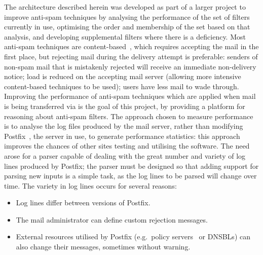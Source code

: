 \documentclass[draft]{svmult}
\begin{document}
The architecture described herein was developed as part of a larger project
to improve anti-spam techniques by analysing the performance of the set of
filters currently in use, optimising the order and membership of the set
based on that analysis, and developing supplemental filters where there is
a deficiency.  Most anti-spam techniques are
content-based~\cite{a-plan-for-spam, word-stemming, relaxed-online-svms},
which requires accepting the mail in the first place, but rejecting mail
during the delivery attempt is preferable: senders of non-spam mail that is
mistakenly rejected will receive an immediate non-delivery notice; load is
reduced on the accepting mail server (allowing more intensive content-based
techniques to be used); users have less mail to wade through.  Improving
the performance of anti-spam techniques which are applied when mail is
being transferred via \SMTP{}\footnotemark{} is the goal of this project,
by providing a platform for reasoning about anti-spam filters.  The
approach chosen to measure performance is to analyse the log files produced
by the mail server, rather than modifying Postfix~\cite{postfix}, the
\SMTP{} server in use, to generate performance statistics: this approach
improves the chances of other sites testing and utilising the software.
The need arose for a parser capable of dealing with the great number and
variety of log lines produced by Postfix; the parser must be designed so
that adding support for parsing new inputs is a simple task, as the log
lines to be parsed will change over time.  The variety in log lines occurs
for several reasons:

\begin{itemize}

    \item Log lines differ between versions of Postfix.
        
    \item The mail administrator can define custom rejection
        messages.

    \item External resources utilised by Postfix (e.g.\ policy
        servers~\cite{policy-servers} or DNSBLs) can also change their
        messages, sometimes without warning.

\end{itemize}
\end{document}
